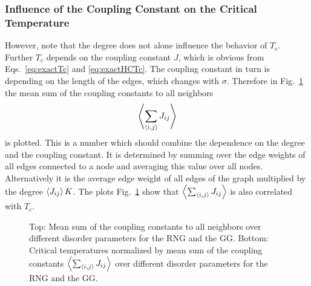     \subsubsection{Influence of the Coupling Constant on the Critical Temperature}%
    \label{sssec:J}
        However, note that the degree does not alone influence the behavior of \(T_c\).
        Further \(T_c\) depends on the coupling constant \(J\), which is
        obvious from Eqs.\ \eqref{eq:exactTc} and \eqref{eq:exactHCTc}. The
        coupling constant in turn is depending on the length of the edges,
        which changes with \(\sigma\).
        Therefore  in Fig.\ \ref{fig:TcJ}
        the mean sum of the coupling constants to all neighbors
        \begin{equation}
            \left< \sum_{\left< i,j \right>} J_{ij} \right>
        \end{equation}
        is plotted. This is a number which should combine the dependence on
        the degree and the coupling constant. It is determined by summing
        over the edge weights of all edges connected to a node and averaging
        this value over all nodes. Alternatively it is the average edge weight
        of all edges of the graph multiplied by the degree \(\left< J_{ij} \right> K\).
        The plots Fig.\ \ref{fig:TcJ}
        show that \(\left< \sum_{\left< i,j \right>} J_{ij} \right>\) is also correlated with \(T_c\).
        \begin{figure}[hbtp]
            \centering


            \caption[Critical Temperature Normalized by Mean Sum of the Coupling Constants]
            {
                Top: Mean sum of the coupling constants to all
                neighbors over different disorder parameters for
                 the RNG and
                 the GG.
                Bottom: Critical temperatures normalized by mean sum of the
                coupling constants \(\left< \sum_{\left< i,j \right>} J_{ij} \right>\) over different
                disorder parameters for
                 the RNG and
                 the GG.
            }
            \label{fig:TcJ}
        \end{figure}\\
